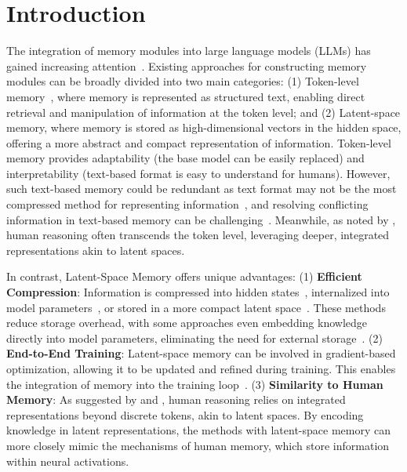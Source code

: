 \vspace{-20pt}
\section{Introduction}
\label{sec:introduction}
The integration of memory modules into large language models (LLMs) has gained increasing attention~\citep{lscs}. 
Existing approaches for constructing memory modules can be broadly divided into two main categories: (1) Token-level memory~\citep{memgpt,memllm}, where memory is represented as structured text, enabling direct retrieval and manipulation of information at the token level; and (2) Latent-space memory, where memory is stored as high-dimensional vectors in the hidden space, offering a more abstract and compact representation of information. Token-level memory provides adaptability (the base model can be easily replaced) and interpretability (text-based format is easy to understand for humans). 
However, such text-based memory could be redundant as text format may not be the most compressed method for representing information~\citep{nncp_v2,tiny_transformers_for_text_compression,enhanced_text_compression},  
and resolving conflicting information in text-based memory can be challenging~\citep{whoswho}. Meanwhile, as noted by \citet{fedorenko2024language,coconut}, human reasoning often transcends the token level, leveraging deeper, integrated representations akin to latent spaces. 

\vspace{-3pt}

In contrast, Latent-Space Memory offers unique advantages: (1) \textbf{Efficient Compression}: Information is compressed into hidden states~\citep{memoryllm}, internalized into model parameters~\citep{self-param}, or stored in a more compact latent space~\citep{larimar}. These methods reduce storage overhead, with some approaches even embedding knowledge directly into model parameters, eliminating the need for external storage~\citep{self-param}. (2) \textbf{End-to-End Training}: Latent-space memory can be involved in gradient-based optimization, allowing it to be updated and refined during training. This enables the integration of memory into the training loop~\citep{em2,LongMEM,in-context-auto-encoder}.
(3) \textbf{Similarity to Human Memory}: As suggested by \citet{fedorenko2024language} and \citet{coconut}, human reasoning relies on integrated representations beyond discrete tokens, akin to latent spaces. By encoding knowledge in latent representations, the methods with latent-space memory can more closely mimic the mechanisms of human memory, which store information within neural activations. 

